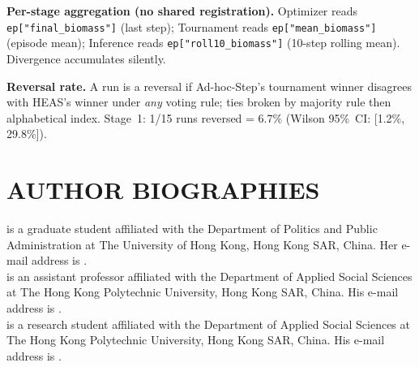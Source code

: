 \documentclass{wscpaperproc}
\begin{document}
\textbf{Per-stage aggregation (no shared registration).} Optimizer reads
\texttt{ep["final\_biomass"]} (last step); Tournament reads
\texttt{ep["mean\_biomass"]} (episode mean); Inference reads
\texttt{ep["roll10\_biomass"]} (10-step rolling mean). Divergence accumulates silently.

\textbf{Reversal rate.} A run is a reversal if Ad-hoc-Step's tournament
winner disagrees with HEAS's winner under \emph{any} voting rule; ties
broken by majority rule then alphabetical index. Stage~1: 1/15 runs
reversed = 6.7\% (Wilson 95\%~CI: [1.2\%, 29.8\%]).

\begingroup
\small


\endgroup

\section*{AUTHOR BIOGRAPHIES}

 is a graduate student affiliated with the Department of Politics and Public Administration at The University of Hong Kong, Hong Kong SAR, China. Her e-mail address is .\\

 is an assistant professor affiliated with the Department of Applied Social Sciences at The Hong Kong Polytechnic University, Hong Kong SAR, China. His e-mail address is .\\

 is a research student affiliated with the Department of Applied Social Sciences at The Hong Kong Polytechnic University, Hong Kong SAR, China. His e-mail address is .
\end{document}

